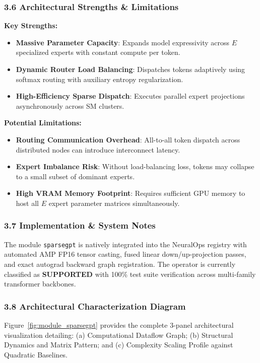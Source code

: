\subsubsection*{3.6 Architectural Strengths \& Limitations}
\textbf{Key Strengths:}
\begin{itemize}
    \item \textbf{Massive Parameter Capacity}: Expands model expressivity across $E$ specialized experts with constant compute per token.
    \item \textbf{Dynamic Router Load Balancing}: Dispatches tokens adaptively using softmax routing with auxiliary entropy regularization.
    \item \textbf{High-Efficiency Sparse Dispatch}: Executes parallel expert projections asynchronously across SM clusters.
\end{itemize}

\textbf{Potential Limitations:}
\begin{itemize}
    \item \textbf{Routing Communication Overhead}: All-to-all token dispatch across distributed nodes can introduce interconnect latency.
    \item \textbf{Expert Imbalance Risk}: Without load-balancing loss, tokens may collapse to a small subset of dominant experts.
    \item \textbf{High VRAM Memory Footprint}: Requires sufficient GPU memory to host all $E$ expert parameter matrices simultaneously.
\end{itemize}

\subsubsection*{3.7 Implementation \& System Notes}
The module \texttt{sparsegpt} is natively integrated into the NeuralOps registry with automated AMP FP16 tensor casting, fused linear down/up-projection passes, and exact autograd backward graph registration. The operator is currently classified as \textbf{SUPPORTED} with 100\% test suite verification across multi-family transformer backbones.

\subsubsection*{3.8 Architectural Characterization Diagram}
Figure~\ref{fig:module_sparsegpt} provides the complete 3-panel architectural visualization detailing: (a) Computational Dataflow Graph; (b) Structural Dynamics and Matrix Pattern; and (c) Complexity Scaling Profile against Quadratic Baselines.

